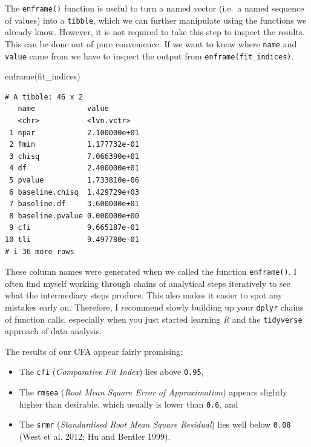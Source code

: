 \documentclass[
  letterpaper,
  DIV=11,
  numbers=noendperiod]{scrreprt}
\newenvironment{Shaded}{\begin{snugshade}}{\end{snugshade}}
\newcommand{\FunctionTok}[1]{\textcolor[rgb]{0.28,0.35,0.67}{#1}}
\newcommand{\NormalTok}[1]{\textcolor[rgb]{0.00,0.23,0.31}{#1}}
\begin{document}
The \texttt{enframe()} function is useful to turn a named vector (i.e.~a
named sequence of values) into a \texttt{tibble}, which we can further
manipulate using the functions we already know. However, it is not
required to take this step to inspect the results. This can be done out
of pure convenience. If we want to know where \texttt{name} and
\texttt{value} came from we have to inspect the output from
\texttt{enframe(fit\_indices)}.

\begin{Shaded}
\begin{Highlighting}[]
\FunctionTok{enframe}\NormalTok{(fit\_indices)}
\end{Highlighting}
\end{Shaded}

\begin{verbatim}
# A tibble: 46 x 2
   name            value       
   <chr>           <lvn.vctr>  
 1 npar            2.100000e+01
 2 fmin            1.177732e-01
 3 chisq           7.066390e+01
 4 df              2.400000e+01
 5 pvalue          1.733810e-06
 6 baseline.chisq  1.429729e+03
 7 baseline.df     3.600000e+01
 8 baseline.pvalue 0.000000e+00
 9 cfi             9.665187e-01
10 tli             9.497780e-01
# i 36 more rows
\end{verbatim}

These column names were generated when we called the function
\texttt{enframe()}. I often find myself working through chains of
analytical steps iteratively to see what the intermediary steps produce.
This also makes it easier to spot any mistakes early on. Therefore, I
recommend slowly building up your \texttt{dplyr} chains of function
calls, especially when you just started learning \emph{R} and the
\texttt{tidyverse} approach of data analysis.

The results of our CFA appear fairly promising:

\begin{itemize}
\item
  The \texttt{cfi} (\emph{Comparative Fit Index}) lies above
  \texttt{0.95},
\item
  The \texttt{rmsea} (\emph{Root Mean Square Error of Approximation})
  appears slightly higher than desirable, which usually is lower than
  \texttt{0.6}, and
\item
  The \texttt{srmr} (\emph{Standardised Root Mean Square Residual}) lies
  well below \texttt{0.08} (West et al. 2012; Hu and Bentler 1999).
\end{itemize}
\end{document}
